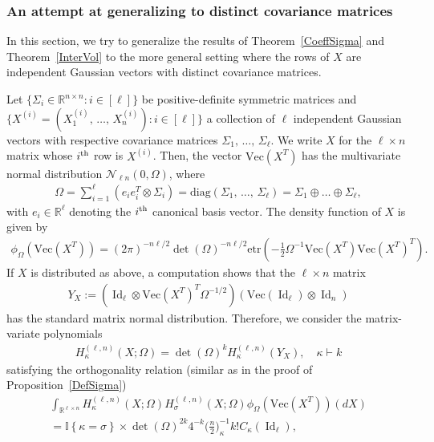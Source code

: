 \documentclass[10pt]{amsart}
\theoremstyle{definition}\newtheorem{defi}[theo]{Definition}\newtheorem{rema}[theo]{Remark}\newtheorem{exam}[theo]{Example}\newtheorem{exem}[theo]{Example}\newtheorem{nota}[theo]{Notation}
\DeclareMathOperator{\Id}{Id}
\newcommand{\diag}{\mathrm{diag}}
\renewcommand{\Vec}{\mathrm{Vec}}
\newcommand{\clN}{\mathcal{N}}
\newcommand{\R}{\mathbb{R}}
\newcommand{\ind}[1]{\mathbb{I}
\left\{#1\right\}}
\newcommand{\etr}[1]{\mathrm{etr}\left(#1\right)}
\begin{document}
\subsubsection{An attempt at generalizing to distinct covariance matrices}\label{General}
In this section, we try to generalize the results of Theorem~\ref{CoeffSigma} and Theorem~\ref{InterVol} to the more general setting where the rows of $X$ are independent Gaussian vectors with distinct covariance matrices.

Let $\{\Sigma_i \in \R^{n\times n} : i\in [\ell]\}$ be positive-definite symmetric matrices and $\{X^{(i)}=(X^{(i)}_1,\,\ldots,\,X^{(i)}_n):i\in [\ell]\}$ a collection of $\ell$ independent Gaussian vectors with respective covariance matrices $\Sigma_1,\,\ldots,\,\Sigma_{\ell}$. We write $X$ for the $\ell \times n$ matrix whose $i^{\rm th}$ row is $X^{(i)}$. Then, the vector $\Vec(X^T)$ has the multivariate normal distribution $\clN_{\ell n}(0,\Omega)$, where
\begin{gather*}
\Omega= \sum_{i=1}^{\ell} \left(e_ie_i^T \otimes \Sigma_i\right) = \diag(\Sigma_1,\,\ldots,\,\Sigma_{\ell}) = \Sigma_1 \oplus \ldots \oplus \Sigma_{\ell},
\end{gather*}
with $e_i \in \R^{\ell}$ denoting the $i^{\rm th}$ canonical basis vector. The density function of $X$ is given by
\begin{gather*}
\phi_{\Omega}\left(\Vec\left(X^T\right)\right) = (2\pi)^{-n\ell/2} \det(\Omega)^{-n\ell/2} \etr{ -\frac{1}{2} \Omega^{-1}\Vec\left(X^T\right)\Vec\left(X^T\right)^T}.
\end{gather*}
If $X $ is distributed as above, a computation shows that the $\ell \times n$ matrix
\begin{gather*}
Y_X:= \left(\Id_{\ell} \otimes \Vec\left(X^T\right)^T \Omega^{-1/2}\right) \left(\Vec(\Id_{\ell}) \otimes \Id_n\right)
\end{gather*}
has the standard matrix normal distribution. Therefore, we consider the matrix-variate polynomials
\begin{gather}\label{HerOmega}
H^{(\ell,n)}_{\kappa}(X;\Omega) = \det(\Omega)^{k} H_{\kappa}^{(\ell,n)}(Y_X), \quad \kappa \vdash k
\end{gather}
satisfying the orthogonality relation (similar as in the proof of Proposition~\ref{DefSigma})
\begin{multline*}
\int_{\R^{\ell \times n}} H^{(\ell,n)}_{\kappa}(X;\Omega) H^{(\ell,n)}_{\sigma}(X;\Omega) \phi_{\Omega}(\Vec(X^T)) (dX)
\\
= \ind{\kappa=\sigma} \times \det(\Omega)^{2k } 4^{-k}\bigg(\frac{n}{2}\bigg)_{\kappa}^{-1} k !C_{\kappa}(\Id_{\ell}),
\end{multline*}
\end{document}
